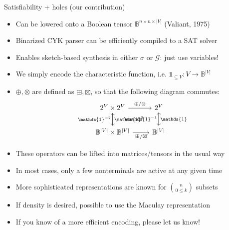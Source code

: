 \documentclass{beamer}
\begin{document}
    \begin{frame}[fragile]{Satisfiability + holes (our contribution)}
        \begin{itemize}
            \item Can be lowered onto a Boolean tensor $\mathbb{B}^{n\times n \times |V|}$ (Valiant, 1975)
            \item Binarized CYK parser can be efficiently compiled to a SAT solver
            \item Enables sketch-based synthesis in either $\sigma$ or $\mathcal G$: just use variables!
            \item We simply encode the characteristic function, i.e. $\mathds{1}_{\subseteq V}: V\rightarrow \mathbb{B}^{|V|}$
            \item $\oplus, \otimes$ are defined as $\boxplus, \boxtimes$, so that the following diagram commutes:
            \[\begin{tikzcd}
                  2^V \times 2^V \arrow[r, "\oplus/\otimes"] \arrow[d, "\mathds{1}^2"]
                  & 2^V \arrow[d, "\mathds{1}\phantom{^{-1}}"] \\
                  \mathbb{B}^{|V|} \times \mathbb{B}^{|V|} \arrow[r, "\boxplus/\boxtimes", labels=below] \arrow[u, "\mathds{1}^{-2}"]
                  & \mathbb{B}^{|V|} \arrow[u, "\mathds{1}^{-1}"]
            \end{tikzcd}\]
            \item These operators can be lifted into matrices/tensors in the usual way
            \item In most cases, only a few nonterminals are active at any given time
            \item More sophisticated representations are known for $\binom{n}{0 \leq k}$ subsets
            \item If density is desired, possible to use the Maculay representation
            \item If you know of a more efficient encoding, please let us know!
        \end{itemize}
    \end{frame}
\end{document}

